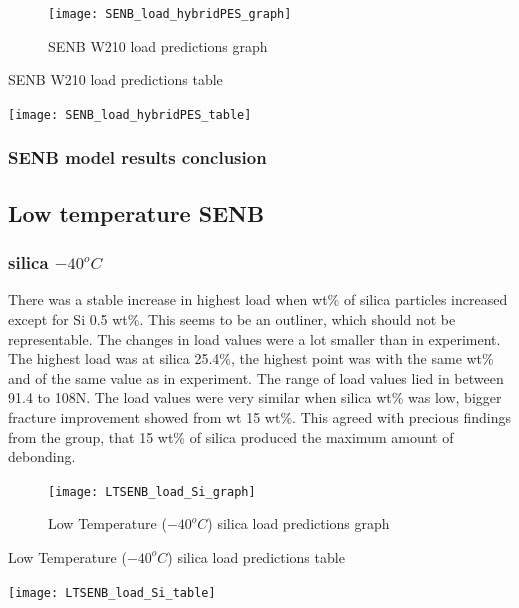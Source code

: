 \documentclass[numbers=noendperiod,chapterprefix=on]{icldt} %
\begin{document}
\begin{figure}[!hp]
  \centering
  \texttt{[image: SENB\_load\_hybridPES\_graph]}\label{SENB_load_hybridPES_graph}
  \caption{SENB W210 load predictions graph}
  \end{figure}
  \FloatBarrier
 
\begin{table}
   \centering
   \caption{SENB W210 load predictions table}\label{SENB_load_hybridPES_table}
   \texttt{[image: SENB\_load\_hybridPES\_table]}
   \end{table}
   \FloatBarrier
   
  \subsubsection{SENB model results conclusion}
   
 \subsection{Low temperature SENB} \label{FE_LT_SENB}
 
\subsubsection{silica $ -40 ^{o}C$}
There was a stable increase in highest load when wt\% of silica particles increased except for Si 0.5 wt\%. This seems to be an outliner, which should not be representable.  The changes in load values were a lot smaller than in experiment. The highest load was at silica 25.4\%, the highest point was with the same wt\% and of the same value as in experiment. The range of load values lied in between 91.4 to 108N. The load values were very similar when silica wt\% was low, bigger fracture improvement showed from wt 15 wt\%. This agreed with precious findings from the group, that 15 wt\% of silica produced the maximum amount of debonding. 

\begin{figure}[!hp]
  \centering
  \texttt{[image: LTSENB\_load\_Si\_graph]}\label{LTSENB_load_Si_graph}
  \caption{Low Temperature ($ -40 ^{o}C$) silica load predictions graph}
  \end{figure}
  \FloatBarrier
 
 \begin{table}
   \centering
   \caption{Low Temperature ($ -40 ^{o}C$) silica load predictions table}\label{LTSENB_load_Si_table}
   \texttt{[image: LTSENB\_load\_Si\_table]}
   \end{table}
   \FloatBarrier
\end{document}
